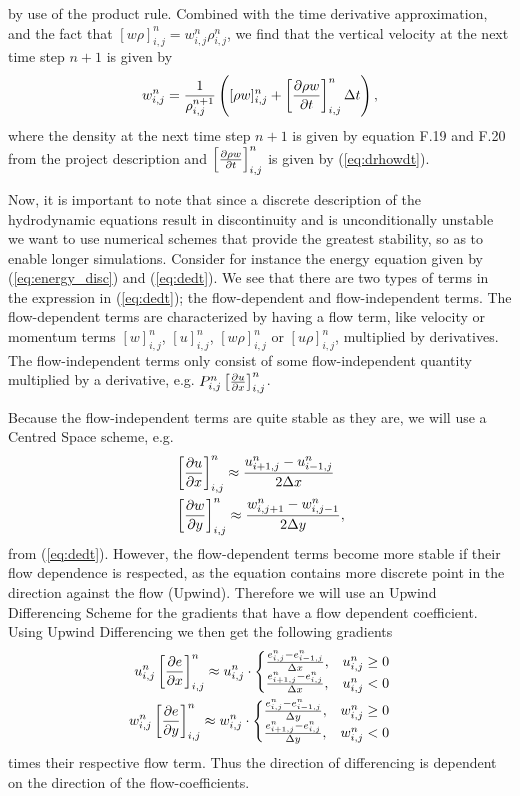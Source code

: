 \documentclass{emulateapj}
\begin{document}
	by use of the product rule. Combined with the time derivative approximation, and the fact that $[w\rho]^n_{i,j} = w^n_{i,j} \rho^n_{i,j}$, we find that the vertical velocity at the next time step $n+1$ is given by 
	\begin{align}
		w^n_{i,j} = \frac{1}{\rho^{n+1}_{i,j}}\left([\rho w]^n_{i,j} + \left[\pdv{\rho w}{t}\right]^n_{i,j}\Delta t\right),
	\end{align}
	where the density at the next time step $n+1$ is given by equation F.19 and F.20 from the project description and $\left[\pdv{\rho w}{t}\right]^n_{i,j}$ is given by (\ref{eq:drhowdt}). 
	
	Now, it is important to note that since a discrete description of the hydrodynamic equations result in discontinuity and is unconditionally unstable we want to use numerical schemes that provide the greatest stability, so as to enable longer simulations. Consider for instance the energy equation given by (\ref{eq:energy_disc}) and (\ref{eq:dedt}). We see that there are two types of terms in the expression in (\ref{eq:dedt}); the flow-dependent and flow-independent terms. The flow-dependent terms are characterized by having a flow term, like velocity or momentum terms $\left[w\right]^n_{i,j}$, $\left[u\right]^n_{i,j}$, $\left[w\rho\right]^n_{i,j}$ or $\left[u\rho\right]^n_{i,j}$, multiplied by derivatives. The flow-independent terms only consist of some flow-independent quantity multiplied by a derivative, e.g. $P^n_{i,j} \left[\pdv{u}{x}\right]^n_{i,j}$. 
	
	Because the flow-independent terms are quite stable as they are, we will use a Centred Space scheme, e.g.
	\begin{align}
		&\left[\pdv{u}{x}\right]^n_{i,j} \approx \frac{u^n_{i + 1, j} - u^n_{i - 1, j}}{2\Delta x}\\
		&\left[\pdv{w}{y}\right]^n_{i,j} \approx \frac{w^n_{i, j + 1} - w^n_{i, j - 1}}{2\Delta y},
	\end{align}
	from (\ref{eq:dedt}). However, the flow-dependent terms become more stable if their flow dependence is respected, as the equation contains more discrete point in the direction against the flow (Upwind). Therefore we will use an Upwind Differencing Scheme for the gradients that have a flow dependent coefficient. Using Upwind Differencing we then get the following gradients
	\begin{align}
		u^n_{i,j}\left[\pdv{e}{x}\right]^n_{i,j}\approx u^n_{i,j}\cdot
		\begin{cases}
			\frac{e^n_{i,j} - e^n_{i-1,j}}{\Delta x}, & u^n_{i,j}\geq0\\
			\frac{e^n_{i+1,j} - e^n_{i,j}}{\Delta x}, & u^n_{i,j}<0
		\end{cases}\\
		w^n_{i,j}\left[\pdv{e}{y}\right]^n_{i,j}\approx w^n_{i,j}\cdot
		\begin{cases}
			\frac{e^n_{i,j} - e^n_{i-1,j}}{\Delta y}, & w^n_{i,j}\geq0\\
			\frac{e^n_{i+1,j} - e^n_{i,j}}{\Delta y}, & w^n_{i,j}<0
		\end{cases}	
	\end{align}
	times their respective flow term. Thus the direction of differencing is dependent on the direction of the flow-coefficients. 
	
\end{document}
